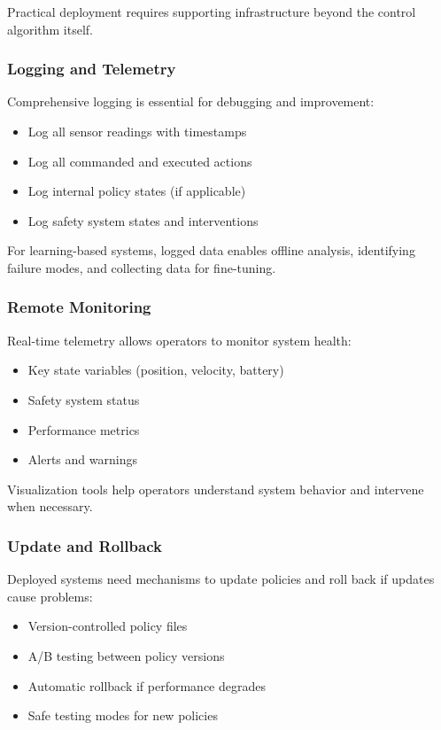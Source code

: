 Practical deployment requires supporting infrastructure beyond the control algorithm itself.

\subsubsection{Logging and Telemetry}

Comprehensive logging is essential for debugging and improvement:
\begin{itemize}
    \item Log all sensor readings with timestamps
    \item Log all commanded and executed actions
    \item Log internal policy states (if applicable)
    \item Log safety system states and interventions
\end{itemize}

For learning-based systems, logged data enables offline analysis, identifying failure modes, and collecting data for fine-tuning.

\subsubsection{Remote Monitoring}

Real-time telemetry allows operators to monitor system health:
\begin{itemize}
    \item Key state variables (position, velocity, battery)
    \item Safety system status
    \item Performance metrics
    \item Alerts and warnings
\end{itemize}

Visualization tools help operators understand system behavior and intervene when necessary.

\subsubsection{Update and Rollback}

Deployed systems need mechanisms to update policies and roll back if updates cause problems:
\begin{itemize}
    \item Version-controlled policy files
    \item A/B testing between policy versions
    \item Automatic rollback if performance degrades
    \item Safe testing modes for new policies
\end{itemize}

